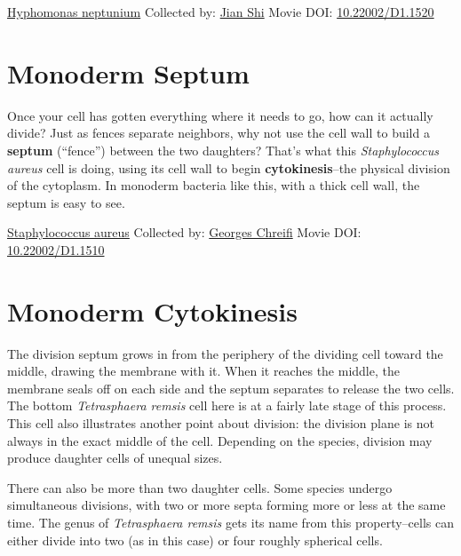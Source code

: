 \documentclass[]{tufte-book}
\begin{document}
\hypertarget{htmlwidget-39466ebf6cb014086192}{}

\label{fig:5-3b}\protect\hyperlink{tree}{Hyphomonas neptunium} Collected by: \protect\hyperlink{jian_shi}{Jian Shi} Movie DOI: \href{https://doi.org/10.22002/D1.1520}{10.22002/D1.1520}

\hypertarget{monoderm-septum}{%
\section{Monoderm Septum}\label{monoderm-septum}}

Once your cell has gotten everything where it needs to go, how can it actually divide? Just as fences separate neighbors, why not use the cell wall to build a \textbf{septum} (``fence'') between the two daughters? That's what this \emph{Staphylococcus aureus} cell is doing, using its cell wall to begin \textbf{cytokinesis}--the physical division of the cytoplasm. In monoderm bacteria like this, with a thick cell wall, the septum is easy to see.



\hypertarget{htmlwidget-52bf3dcbb70ed3811ae8}{}

\label{fig:5-4}\protect\hyperlink{tree}{Staphylococcus aureus} Collected by: \protect\hyperlink{georges_chreifi}{Georges Chreifi} Movie DOI: \href{https://doi.org/10.22002/D1.1510}{10.22002/D1.1510}

\hypertarget{monoderm-cytokinesis}{%
\section{Monoderm Cytokinesis}\label{monoderm-cytokinesis}}

The division septum grows in from the periphery of the dividing cell toward the middle, drawing the membrane with it. When it reaches the middle, the membrane seals off on each side and the septum separates to release the two cells. The bottom \emph{Tetrasphaera remsis} cell here is at a fairly late stage of this process. This cell also illustrates another point about division: the division plane is not always in the exact middle of the cell. Depending on the species, division may produce daughter cells of unequal sizes.

There can also be more than two daughter cells. Some species undergo simultaneous divisions, with two or more septa forming more or less at the same time. The genus of \emph{Tetrasphaera remsis} gets its name from this property--cells can either divide into two (as in this case) or four roughly spherical cells.
\end{document}
